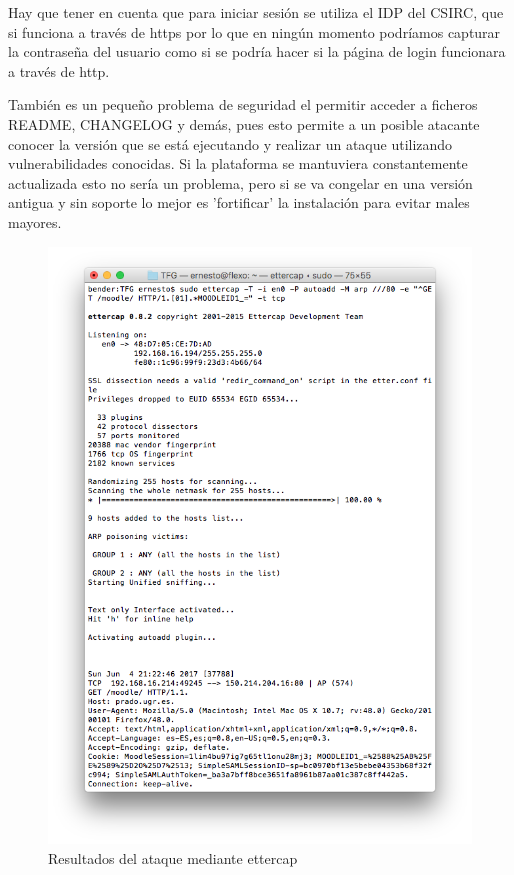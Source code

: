 \bigskip 
Hay que tener en cuenta que para iniciar sesión se utiliza el IDP del CSIRC, que si funciona a través de https por lo que en ningún momento podríamos capturar la contraseña del usuario como si se podría hacer si la página de login funcionara a través de http.

\bigskip
También es un pequeño problema de seguridad el permitir acceder a ficheros README, CHANGELOG y demás, pues esto permite a un posible atacante conocer la versión que se está ejecutando y realizar un ataque utilizando vulnerabilidades conocidas. Si la plataforma se mantuviera constantemente actualizada esto no sería un problema, pero si se va congelar en una versión antigua y sin soporte lo mejor es 'fortificar' la instalación para evitar males mayores.

\begin{figure}[H]
\centering
\includegraphics[width=1.0\textwidth]{../screenshots/ettercap}
\caption{Resultados del ataque mediante ettercap}
\label{fig:ettercap}
\end{figure}



